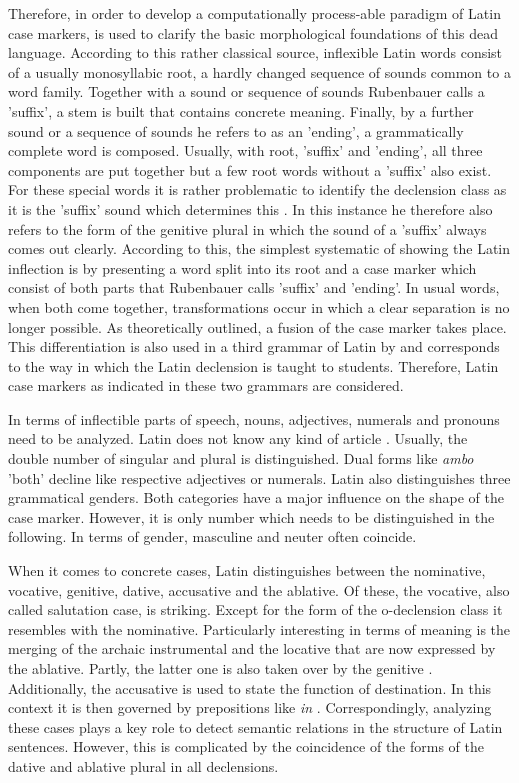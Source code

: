 \documentclass[11pt,a4paper,twoside,openright]{scrbook}
\begin{document}
Therefore, in order to develop a computationally process-able paradigm of Latin case markers, \citet{rubenbauer1995lat} is used to clarify the basic morphological foundations of this dead language. According to this rather classical source, inflexible Latin words consist of a usually monosyllabic root, a hardly changed sequence of sounds common to a word family. Together with a sound or sequence of sounds Rubenbauer calls a 'suffix', a stem is built that contains concrete meaning. Finally, by a further sound or a sequence of sounds he refers to as an 'ending', a grammatically complete word is composed. Usually, with root, 'suffix' and 'ending', all three components are put together but a few root words without a 'suffix' also exist. For these special words it is rather problematic to identify the declension class as it is the 'suffix' sound which determines this \citep{rubenbauer1995lat}. In this instance he therefore also refers to the form of the genitive plural in which the sound of a 'suffix' always comes out clearly.  According to this, the simplest systematic of showing the Latin inflection is by presenting a word split into its root and a case marker which consist of both parts that Rubenbauer calls 'suffix' and 'ending'. In usual words, when both come together, transformations occur in which a clear separation is no longer possible. As theoretically outlined, a fusion of the case marker takes place. This differentiation is also used in a third grammar of Latin by \citet{touratier2013lat} and corresponds to the way in which the Latin declension is taught to students. Therefore, Latin case markers as indicated in these two grammars are considered.

In terms of inflectible parts of speech, nouns, adjectives, numerals and pronouns need to be analyzed. Latin does not know any kind of article \citep{panhuis2015lat}. Usually, the double number of singular and plural is distinguished. Dual forms like \textit{ambo} 'both' decline like respective adjectives or numerals. Latin also distinguishes three grammatical genders. Both categories have a major influence on the shape of the case marker. However, it is only number which needs to be distinguished in the following. In terms of gender, masculine and neuter often coincide.

When it comes to concrete cases, Latin distinguishes between the nominative, vocative, genitive, dative, accusative and the ablative. Of these, the vocative, also called salutation case, is striking. Except for the form of the o-declension class it resembles with the nominative. Particularly interesting in terms of meaning is the merging of the archaic instrumental and the locative that are now expressed by the ablative. Partly, the latter one is also taken over by the genitive \citep{panhuis2015lat}. Additionally, the accusative is used to state the function of destination. In this context it is then governed by prepositions like \textit{in} \citep{blake1994case}. Correspondingly, analyzing these cases plays a key role to detect  semantic relations in the structure of Latin sentences. However, this is complicated by the coincidence of the forms of the dative and ablative plural in all declensions.
\end{document}
